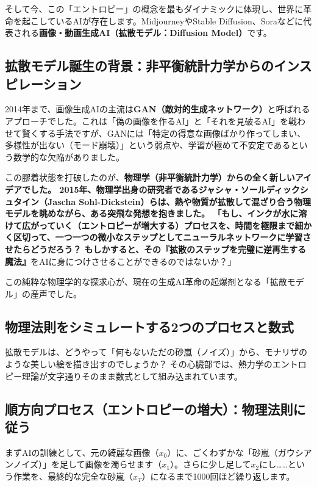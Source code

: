そして今、この「エントロピー」の概念を最もダイナミックに体現し、世界に革命を起こしているAIが存在します。MidjourneyやStable Diffusion、Soraなどに代表される\textbf{画像・動画生成AI（拡散モデル：Diffusion Model）}です。

\subsection{拡散モデル誕生の背景：非平衡統計力学からのインスピレーション}

2014年まで、画像生成AIの主流は\textbf{GAN（敵対的生成ネットワーク）}と呼ばれるアプローチでした。これは「偽の画像を作るAI」と「それを見破るAI」を戦わせて賢くする手法ですが、GANには「特定の得意な画像ばかり作ってしまい、多様性が出ない（モード崩壊）」という弱点や、学習が極めて不安定であるという数学的な欠陥がありました。

この膠着状態を打破したのが、\textbf{物理学（非平衡統計力学）からの全く新しいアイデアでした。 2015年、物理学出身の研究者であるジャシャ・ソールディックシュタイン（Jascha Sohl-Dickstein）らは、熱や物質が拡散して混ざり合う物理モデルを眺めながら、ある突飛な発想を抱きました。 「もし、インクが水に溶けて広がっていく（エントロピーが増大する）プロセスを、時間を極限まで細かく区切って、一つ一つの微小なステップとしてニューラルネットワークに学習させたらどうだろう？ もしかすると、その『拡散のステップを完璧に逆再生する魔法』}をAIに身につけさせることができるのではないか？」

この純粋な物理学的な探求心が、現在の生成AI革命の起爆剤となる「拡散モデル」の産声でした。

\subsection{物理法則をシミュレートする2つのプロセスと数式}

拡散モデルは、どうやって「何もないただの砂嵐（ノイズ）」から、モナリザのような美しい絵を描き出すのでしょうか？ その心臓部では、熱力学のエントロピー理論が文字通りそのまま数式として組み込まれています。

\subsection{順方向プロセス（エントロピーの増大）：物理法則に従う}

まずAIの訓練として、元の綺麗な画像（\(x_0\)）に、ごくわずかな「砂嵐（ガウシアンノイズ）」を足して画像を濁らせます（\(x_1\)）。さらに少し足して\(x_2\)にし\ldots{}\ldots{}という作業を、最終的な完全な砂嵐（\(x_T\)）になるまで1000回ほど繰り返します。

